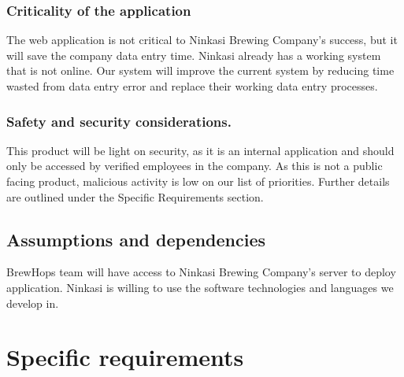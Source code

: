 \documentclass[draftclsnofoot,onecolumn,letterpaper,10pt,compsoc]{IEEEtran}
\begin{document}
		\subsubsection{Criticality of the application}
		The web application is not critical to Ninkasi Brewing Company’s success, but it will save the company data entry time.
		Ninkasi already has a working system that is not online.
		Our system will improve the current system by reducing time wasted from data entry error and replace their working data entry processes.

		\subsubsection{Safety and security considerations.}
		This product will be light on security, as it is an internal application and should only be accessed by verified employees in the company.
		As this is not a public facing product, malicious activity is low on our list of priorities.
		Further details are outlined under the Specific Requirements section.

	\subsection{Assumptions and dependencies}
    BrewHops team will have access to Ninkasi Brewing Company's server to deploy application.
    Ninkasi is willing to use the software technologies and languages we develop in.

\section{Specific requirements}
\end{document}
